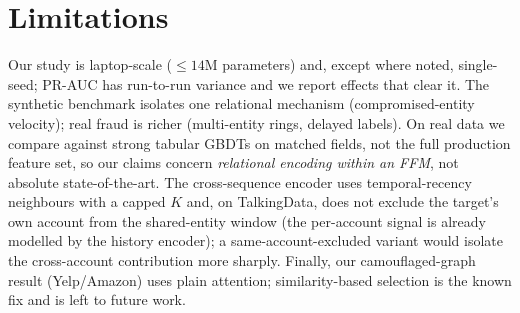 \section{Limitations}
\label{sec:limitations}

Our study is laptop-scale ($\le\!14$M parameters) and, except where noted, single-seed; PR-AUC has
run-to-run variance and we report effects that clear it. The synthetic benchmark isolates one
relational mechanism (compromised-entity velocity); real fraud is richer (multi-entity rings,
delayed labels). On real data we compare against strong tabular GBDTs on matched fields, not the
full production feature set, so our claims concern \emph{relational encoding within an FFM}, not
absolute state-of-the-art. The cross-sequence encoder uses temporal-recency neighbours with a
capped $K$ and, on TalkingData, does not exclude the target's own account from the shared-entity
window (the per-account signal is already modelled by the history encoder); a same-account-excluded
variant would isolate the cross-account contribution more sharply. Finally, our camouflaged-graph
result (Yelp/Amazon) uses plain attention; similarity-based selection is the known fix and is left
to future work.
